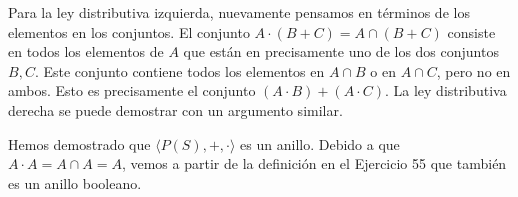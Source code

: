 \begin{enumerate}
\begin{enumerate}
		Para la ley distributiva izquierda, nuevamente pensamos en términos de los elementos en los conjuntos. El conjunto $A \cdot (B + C) = A \cap (B + C)$ consiste en todos los elementos de $A$ que están en precisamente uno de los dos conjuntos $B, C$. Este conjunto contiene todos los elementos en $A \cap B$ o en $A \cap C$, pero no en ambos. Esto es precisamente el conjunto $(A \cdot B) + (A \cdot C)$. La ley distributiva derecha se puede demostrar con un argumento similar.
		
		Hemos demostrado que $\langle P(S), +, \cdot \rangle$ es un anillo. Debido a que $A \cdot A = A \cap A = A$, vemos a partir de la definición en el Ejercicio 55 que también es un anillo booleano.
	\end{enumerate}

	
	
\end{enumerate}